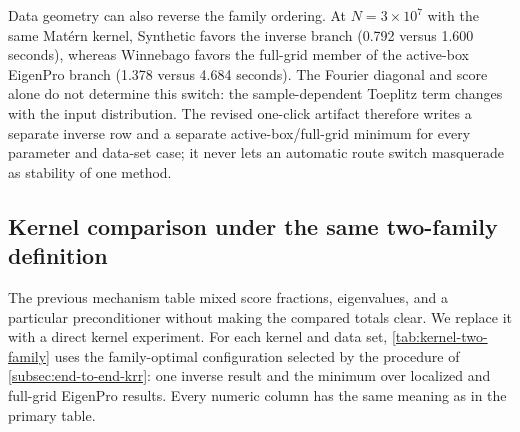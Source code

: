 Data geometry can also reverse the family ordering.  At $N=3\times10^7$ with
the same Mat\'ern kernel, Synthetic favors the inverse branch
(0.792 versus 1.600 seconds), whereas Winnebago favors the full-grid member of
the active-box EigenPro branch (1.378 versus 4.684 seconds).  The Fourier
diagonal and score alone do not determine this switch: the sample-dependent
Toeplitz term changes with the input distribution.  The revised one-click
artifact therefore writes a separate inverse row and a separate
active-box/full-grid minimum for every parameter and data-set case; it never
lets an automatic route switch masquerade as stability of one method.

\subsection{Kernel comparison under the same two-family definition}
\label{subsec:kernel-family-comparison}

The previous mechanism table mixed score fractions, eigenvalues, and a
particular preconditioner without making the compared totals clear.  We
replace it with a direct kernel experiment.  For each kernel and data set,
\cref{tab:kernel-two-family} uses the family-optimal configuration selected by
the procedure of \cref{subsec:end-to-end-krr}: one inverse result and the
minimum over localized and full-grid EigenPro results.  Every numeric column
has the same meaning as in the primary table.

\begin{table}[H]
\centering
\footnotesize
\setlength{\tabcolsep}{3.5pt}
\caption{Two-family comparison at $N=3\times10^7$.  Total is complete
recorded setup plus solve in seconds; speedup is EFGP-CG total divided by the
displayed family total.  Full-grid EigenPro is denoted by $J_m$.}
\label{tab:kernel-two-family}
\end{table}

